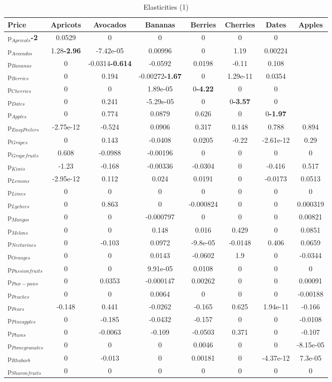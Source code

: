 \documentclass[11pt]{article}
\begin{document}
\begin{table}[h]
\caption{Elasticities (1)}
\label{table:elasticities 1}
\begin{center}
\begin{tabular}{lccccccc} \hline \hline
Price &Apricots &Avocados &Bananas &Berries &Cherries &Dates &Apples \\ \hline
p$_{Apricots}$\textbf{-2} &0.0529 &0 &0 &0 &0 &0 \\
p$_{Avocados}$ &1.28\textbf{-2.96} &-7.42e-05 &0.00996 &0 &1.19 &0.00224 \\
p$_{Bananas}$ &0 &-0.0314\textbf{-0.614} &-0.0592 &0.0198 &-0.11 &0.108 \\
p$_{Berries}$ &0 &0.194 &-0.00272\textbf{-1.67} &0 &1.29e-11 &0.0354 \\
p$_{Cherries}$ &0 &0 &1.89e-05 &0\textbf{-4.22} &0 &0 \\
p$_{Dates}$ &0 &0.241 &-5.29e-05 &0 &0\textbf{-3.57} &0 \\
p$_{Apples}$ &0 &0.774 &0.0879 &0.626 &0 &0\textbf{-1.97} \\
p$_{Easy Peelers}$ &-2.75e-12 &-0.524 &0.0906 &0.317 &0.148 &0.788 &0.894 \\
p$_{Grapes}$ &0 &0.143 &-0.0408 &0.0205 &-0.22 &-2.61e-12 &0.29 \\
p$_{Grapefruits}$ &0.608 &-0.0988 &-0.00196 &0 &0 &0 &0 \\
p$_{Kiwis}$ &-1.23 &-0.168 &-0.00336 &-0.0304 &0 &-0.416 &0.517 \\
p$_{Lemons}$ &-2.95e-12 &0.112 &0.024 &0.0191 &0 &-0.0173 &0.0513 \\
p$_{Limes}$ &0 &0 &0 &0 &0 &0 &0 \\
p$_{Lychees}$ &0 &0.863 &0 &-0.000824 &0 &0 &0.000319 \\
p$_{Mangos}$ &0 &0 &-0.000797 &0 &0 &0 &0.00821 \\
p$_{Melons}$ &0 &0 &0.148 &0.016 &0.429 &0 &0.0851 \\
p$_{Nectarines}$ &0 &-0.103 &0.0972 &-9.8e-05 &-0.0148 &0.406 &0.0659 \\
p$_{Oranges}$ &0 &0 &0.0143 &-0.0602 &1.9 &0 &-0.0344 \\
p$_{Passion fruits}$ &0 &0 &9.91e-05 &0.0108 &0 &0 &0 \\
p$_{Paw-paws}$ &0 &0.0353 &-0.000147 &0.00262 &0 &0 &0.00091 \\
p$_{Peaches}$ &0 &0 &0.0064 &0 &0 &0 &-0.00188 \\
p$_{Pears}$ &-0.148 &0.441 &-0.0262 &-0.165 &0.625 &1.94e-11 &-0.166 \\
p$_{Pineapples}$ &0 &-0.185 &-0.0432 &-0.157 &0 &0 &-0.0108 \\
p$_{Plums}$ &0 &-0.0063 &-0.109 &-0.0503 &0.371 &0 &-0.107 \\
p$_{Pomegranates}$ &0 &0 &0 &0.0046 &0 &0 &-8.15e-05 \\
p$_{Rhubarb}$ &0 &-0.013 &0 &0.00181 &0 &-4.37e-12 &7.3e-05 \\
p$_{Sharon fruits}$ &0 &0 &0 &0 &0 &0 &0 \\
\end{tabular}
\end{center}
\end{table}
\end{document}
